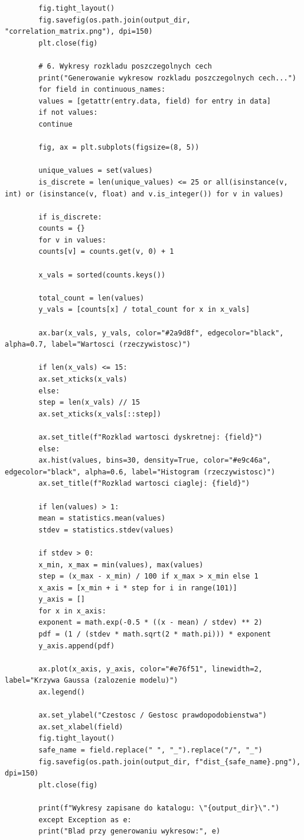 \documentclass[12pt,a4paper]{article}
\begin{document}
\begin{lstlisting}
		fig.tight_layout()
		fig.savefig(os.path.join(output_dir, "correlation_matrix.png"), dpi=150)
		plt.close(fig)
		
		# 6. Wykresy rozkladu poszczegolnych cech
		print("Generowanie wykresow rozkladu poszczegolnych cech...")
		for field in continuous_names:
		values = [getattr(entry.data, field) for entry in data]
		if not values:
		continue
		
		fig, ax = plt.subplots(figsize=(8, 5))
		
		unique_values = set(values)
		is_discrete = len(unique_values) <= 25 or all(isinstance(v, int) or (isinstance(v, float) and v.is_integer()) for v in values)
		
		if is_discrete:
		counts = {}
		for v in values:
		counts[v] = counts.get(v, 0) + 1
		
		x_vals = sorted(counts.keys())
		
		total_count = len(values)
		y_vals = [counts[x] / total_count for x in x_vals]
		
		ax.bar(x_vals, y_vals, color="#2a9d8f", edgecolor="black", alpha=0.7, label="Wartosci (rzeczywistosc)")
		
		if len(x_vals) <= 15:
		ax.set_xticks(x_vals)
		else:
		step = len(x_vals) // 15
		ax.set_xticks(x_vals[::step])
		
		ax.set_title(f"Rozklad wartosci dyskretnej: {field}")
		else:
		ax.hist(values, bins=30, density=True, color="#e9c46a", edgecolor="black", alpha=0.6, label="Histogram (rzeczywistosc)")
		ax.set_title(f"Rozklad wartosci ciaglej: {field}")
		
		if len(values) > 1:
		mean = statistics.mean(values)
		stdev = statistics.stdev(values)
		
		if stdev > 0:
		x_min, x_max = min(values), max(values)
		step = (x_max - x_min) / 100 if x_max > x_min else 1
		x_axis = [x_min + i * step for i in range(101)]
		y_axis = []
		for x in x_axis:
		exponent = math.exp(-0.5 * ((x - mean) / stdev) ** 2)
		pdf = (1 / (stdev * math.sqrt(2 * math.pi))) * exponent
		y_axis.append(pdf)
		
		ax.plot(x_axis, y_axis, color="#e76f51", linewidth=2, label="Krzywa Gaussa (zalozenie modelu)")
		ax.legend()
		
		ax.set_ylabel("Czestosc / Gestosc prawdopodobienstwa")
		ax.set_xlabel(field)
		fig.tight_layout()
		safe_name = field.replace(" ", "_").replace("/", "_")
		fig.savefig(os.path.join(output_dir, f"dist_{safe_name}.png"), dpi=150)
		plt.close(fig)
		
		print(f"Wykresy zapisane do katalogu: \"{output_dir}\".")
		except Exception as e:
		print("Blad przy generowaniu wykresow:", e)
		

\end{lstlisting}
\end{document}
